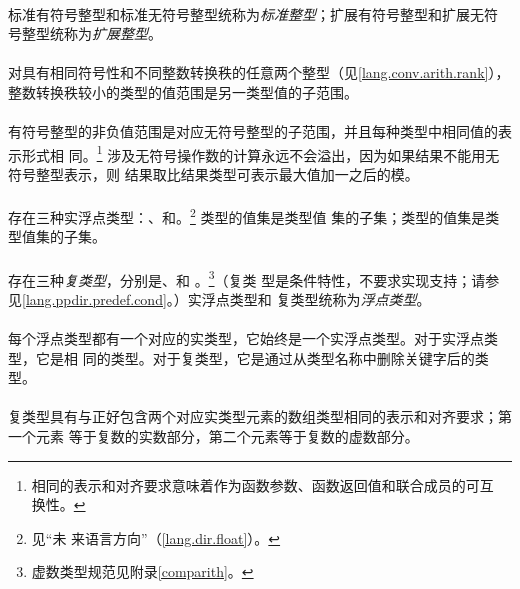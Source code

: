 \paragraph{}
标准有符号整型和标准无符号整型统称为\textit{标准整型}；扩展有符号整型和扩展无符
号整型统称为\textit{扩展整型}。

\paragraph{}
对具有相同符号性和不同整数转换秩的任意两个整型（见\ref{lang.conv.arith.rank}），
整数转换秩较小的类型的值范围是另一类型值的子范围。

\paragraph{}
有符号整型的非负值范围是对应无符号整型的子范围，并且每种类型中相同值的表示形式相
同。\footnote{相同的表示和对齐要求意味着作为函数参数、函数返回值和联合成员的可互
换性。} 涉及无符号操作数的计算永远不会溢出，因为如果结果不能用无符号整型表示，则
结果取比结果类型可表示最大值加一之后的模。

\paragraph{}
存在三种实浮点类型：、和。\footnote{见``未
来语言方向''（\ref{lang.dir.float}）。 } 类型的值集是类型值
集的子集；类型的值集是类型值集的子集。

\paragraph{}
存在三种\textit{复类型}，分别是、和
。\footnote{虚数类型规范见附录\ref{comparith}。}（复类
型是条件特性，不要求实现支持；请参见\ref{lang.ppdir.predef.cond}。）实浮点类型和
复类型统称为\textit{浮点类型}。

\paragraph{}
每个浮点类型都有一个对应的实类型，它始终是一个实浮点类型。对于实浮点类型，它是相
同的类型。对于复类型，它是通过从类型名称中删除关键字后的类型。

\paragraph{}
复类型具有与正好包含两个对应实类型元素的数组类型相同的表示和对齐要求；第一个元素
等于复数的实数部分，第二个元素等于复数的虚数部分。

